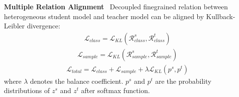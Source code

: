 \textbf{Multiple Relation Alignment} \ Decoupled finegrained relation between heterogeneous student model and teacher model can be aligned by Kullback-Leibler divergence:
\begin{equation}
    \begin{aligned}
        \mathcal{L}_{class} = \mathcal{L}_{KL}(\mathcal{R}_{class}^{s},\mathcal{R}_{class}^{t})
    \end{aligned}
\end{equation}
\begin{equation}
    \begin{aligned}
        \mathcal{L}_{sample} = \mathcal{L}_{KL}(\mathcal{R}_{sample}^{s},\mathcal{R}_{sample}^{t})
    \end{aligned}
\end{equation}
\begin{equation}
    \begin{aligned}
        \mathcal{L}_{total} = \mathcal{L}_{class}+\mathcal{L}_{sample}+\lambda\mathcal{L}_{KL}(p^{s},p^{t})
    \end{aligned}
\end{equation}
where $\lambda$ denotes the balance coefficient. $p^{s}$ and $p^{t}$ are the probability distributions of $z^{s}$ and $z^{t}$ after softmax function.

